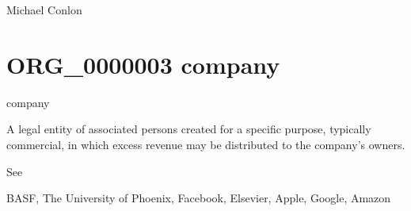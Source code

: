 \documentclass[letterpaper,10pt,english]{sphinxmanual}
\begin{document}
\begin{sphinxShadowBox}

\sphinxAtStartPar
{}
\end{sphinxShadowBox}

\begin{sphinxShadowBox}

\sphinxAtStartPar
Michael Conlon 
\end{sphinxShadowBox}
\begin{quote}
\label{\detokenize{doc-ORG_0000003:org-0000003}}\label{\detokenize{doc-ORG_0000003:company}}\label{\detokenize{doc-ORG_0000003:org-0000003}}
\ignorespaces \end{quote}


\section{ORG\_0000003 \sphinxhyphen{} company}
\label{\detokenize{doc-ORG_0000003:org-0000003-company}}\label{\detokenize{doc-ORG_0000003:index-0}}\label{\detokenize{doc-ORG_0000003::doc}}
\begin{sphinxShadowBox}

\sphinxAtStartPar
company
\end{sphinxShadowBox}

\begin{sphinxShadowBox}

\sphinxAtStartPar
A legal entity of associated persons created for a specific purpose, typically commercial, in which excess revenue may be distributed to the company’s owners.
\end{sphinxShadowBox}

\begin{sphinxShadowBox}

\sphinxAtStartPar
See 
\end{sphinxShadowBox}

\begin{sphinxShadowBox}

\sphinxAtStartPar
BASF, The University of Phoenix, Facebook, Elsevier, Apple, Google, Amazon
\end{sphinxShadowBox}
\end{document}
